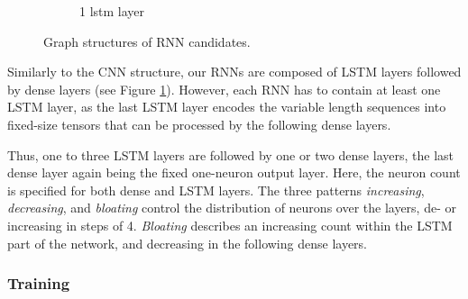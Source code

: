 \begin{figure}
\begin{subfigure}[b]{0.3\linewidth}
\begin{subfigure}[b]{\linewidth}
		\end{subfigure}
		\caption{1 lstm layer}
	\end{subfigure}
	\caption{Graph structures of \gls{RNN} candidates.}
	\label{fig:rnn-structure-abstract}
\end{figure}

Similarly to the \gls{CNN} structure, our \glspl{RNN} are composed of \gls{LSTM} layers followed by dense layers (see Figure \ref{fig:rnn-structure-abstract}). However, each \gls{RNN} has to contain at least one \gls{LSTM} layer, as the last \gls{LSTM} layer encodes the variable length sequences into fixed-size tensors that can be processed by the following dense layers.

Thus, one to three \gls{LSTM} layers are followed by one or two dense layers, the last dense layer again being the fixed one-neuron output layer. Here, the neuron count is specified for both dense and \gls{LSTM} layers. The three patterns \textit{increasing}, \textit{decreasing}, and \textit{bloating} control the distribution of neurons over the layers, de- or increasing in steps of 4. \textit{Bloating} describes an increasing count within the \gls{LSTM} part of the network, and decreasing in the following dense layers.

\subsubsection{Training}

